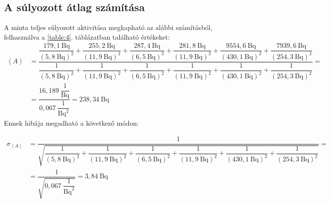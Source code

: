 \subsection{A súlyozott átlag számítása}
A minta teljes súlyozott aktivitása megkapható az alábbi számításból, felhasználva a \ref{table:4}. táblázatban található értékeket:
\begin{align}
\left< A \right>
&=
\dfrac{
\dfrac{179,1\ \text{Bq}}{\left( 5,8\ \text{Bq} \right)^{2}}
+
\dfrac{255,2\ \text{Bq}}{\left( 11,9\ \text{Bq} \right)^{2}}
+
\dfrac{287,4\ \text{Bq}}{\left( 6,5\ \text{Bq} \right)^{2}}
+
\dfrac{281,8\ \text{Bq}}{\left( 11,9\ \text{Bq} \right)^{2}}
+
\dfrac{9554,6\ \text{Bq}}{\left( 430,1\ \text{Bq} \right)^{2}}
+
\dfrac{7939,6\ \text{Bq}}{\left( 254,3\ \text{Bq} \right)^{2}}
}{
\dfrac{1}{\left( 5,8\ \text{Bq} \right)^{2}}
+
\dfrac{1}{\left( 11,9\ \text{Bq} \right)^{2}}
+
\dfrac{1}{\left( 6,5\ \text{Bq} \right)^{2}}
+
\dfrac{1}{\left( 11,9\ \text{Bq} \right)^{2}}
+
\dfrac{1}{\left( 430,1\ \text{Bq} \right)^{2}}
+
\dfrac{1}{\left( 254,3\ \text{Bq} \right)^{2}}
}
= \nonumber \\
&=
\dfrac{16,189\ \dfrac{1}{\text{Bq}}}{0,067\ \dfrac{1}{\text{Bq}^{2}}}
=
238,34\ \text{Bq}
\end{align}
Ennek hibája megadható a következő módon:

\begin{align}
\sigma_{\left< A \right>}
&=
\dfrac{1}{\sqrt{
\dfrac{1}{\left( 5,8\ \text{Bq} \right)^{2}}
+
\dfrac{1}{\left( 11,9\ \text{Bq} \right)^{2}}
+
\dfrac{1}{\left( 6,5\ \text{Bq} \right)^{2}}
+
\dfrac{1}{\left( 11,9\ \text{Bq} \right)^{2}}
+
\dfrac{1}{\left( 430,1\ \text{Bq} \right)^{2}}
+
\dfrac{1}{\left( 254,3\ \text{Bq} \right)^{2}}
}}
= \nonumber \\
&=
\dfrac{1}{\sqrt{0,067\ \dfrac{1}{\text{Bq}^{2}}}}
=
3,84\ \text{Bq}
\end{align}
\newpage
